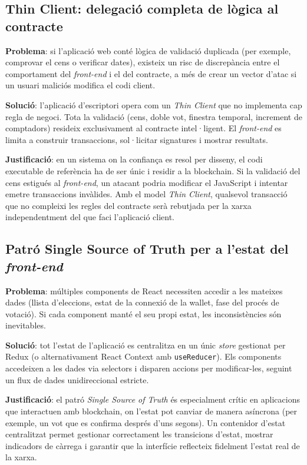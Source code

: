 \subsection{Thin Client: delegació completa de lògica al contracte}
 
\textbf{Problema}: si l'aplicació web conté lògica de validació duplicada (per exemple, comprovar el cens o verificar dates), existeix un risc de discrepància entre el comportament del \textit{front-end} i el del contracte, a més de crear un vector d'atac si un usuari maliciós modifica el codi client.
 
\textbf{Solució}: l'aplicació d'escriptori opera com un \textit{Thin Client} que no implementa cap regla de negoci. Tota la validació (cens, doble vot, finestra temporal, increment de comptadors) resideix exclusivament al contracte intel·ligent. El \textit{front-end} es limita a construir transaccions, sol·licitar signatures i mostrar resultats.
 
\textbf{Justificació}: en un sistema on la confiança es resol per disseny, el codi executable de referència ha de ser únic i residir a la blockchain. Si la validació del cens estigués al \textit{front-end}, un atacant podria modificar el JavaScript i intentar emetre transaccions invàlides. Amb el model \textit{Thin Client}, qualsevol transacció que no compleixi les regles del contracte serà rebutjada per la xarxa independentment del que faci l'aplicació client.
 
\subsection{Patró Single Source of Truth per a l'estat del \textit{front-end}}
 
\textbf{Problema}: múltiples components de React necessiten accedir a les mateixes dades (llista d'eleccions, estat de la connexió de la wallet, fase del procés de votació). Si cada component manté el seu propi estat, les inconsistències són inevitables.
 
\textbf{Solució}: tot l'estat de l'aplicació es centralitza en un únic \textit{store} gestionat per Redux (o alternativament React Context amb \texttt{useReducer}). Els components accedeixen a les dades via selectors i disparen accions per modificar-les, seguint un flux de dades unidireccional estricte.
 
\textbf{Justificació}: el patró \textit{Single Source of Truth} és especialment crític en aplicacions que interactuen amb blockchain, on l'estat pot canviar de manera asíncrona (per exemple, un vot que es confirma després d'uns segons). Un contenidor d'estat centralitzat permet gestionar correctament les transicions d'estat, mostrar indicadors de càrrega i garantir que la interfície reflecteix fidelment l'estat real de la xarxa.
 
